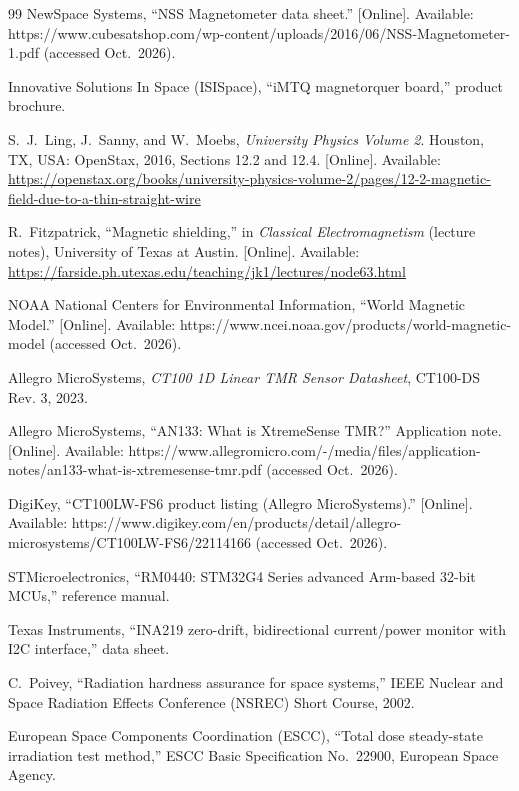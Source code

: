 \documentclass[12pt,a4paper]{article}
\begin{document}
\begin{thebibliography}{99}
NewSpace Systems, ``NSS Magnetometer data sheet.'' [Online]. Available: https://www.cubesatshop.com/wp-content/uploads/2016/06/NSS-Magnetometer-1.pdf (accessed Oct.\ 2026).

Innovative Solutions In Space (ISISpace), ``iMTQ magnetorquer board,'' product brochure.

S.\ J.\ Ling, J.\ Sanny, and W.\ Moebs, \emph{University Physics Volume 2}. Houston, TX, USA: OpenStax, 2016, Sections 12.2 and 12.4. [Online]. Available: \url{https://openstax.org/books/university-physics-volume-2/pages/12-2-magnetic-field-due-to-a-thin-straight-wire}

R.\ Fitzpatrick, ``Magnetic shielding,'' in \emph{Classical Electromagnetism} (lecture notes), University of Texas at Austin. [Online]. Available: \url{https://farside.ph.utexas.edu/teaching/jk1/lectures/node63.html}

NOAA National Centers for Environmental Information, ``World Magnetic Model.'' [Online]. Available: https://www.ncei.noaa.gov/products/world-magnetic-model (accessed Oct.\ 2026).

Allegro MicroSystems, \emph{CT100 1D Linear TMR Sensor Datasheet}, CT100-DS Rev. 3, 2023.

Allegro MicroSystems, ``AN133: What is XtremeSense TMR?'' Application note. [Online]. Available: https://www.allegromicro.com/-/media/files/application-notes/an133-what-is-xtremesense-tmr.pdf (accessed Oct.\ 2026).

DigiKey, ``CT100LW-FS6 product listing (Allegro MicroSystems).'' [Online]. Available: https://www.digikey.com/en/products/detail/allegro-microsystems/CT100LW-FS6/22114166 (accessed Oct.\ 2026).

STMicroelectronics, ``RM0440: STM32G4 Series advanced Arm-based 32-bit MCUs,'' reference manual.

Texas Instruments, ``INA219 zero-drift, bidirectional current/power monitor with I2C interface,'' data sheet.

C.\ Poivey, ``Radiation hardness assurance for space systems,'' IEEE Nuclear and Space Radiation Effects Conference (NSREC) Short Course, 2002.

European Space Components Coordination (ESCC), ``Total dose steady-state irradiation test method,'' ESCC Basic Specification No.~22900, European Space Agency.


\end{thebibliography}
\end{document}
